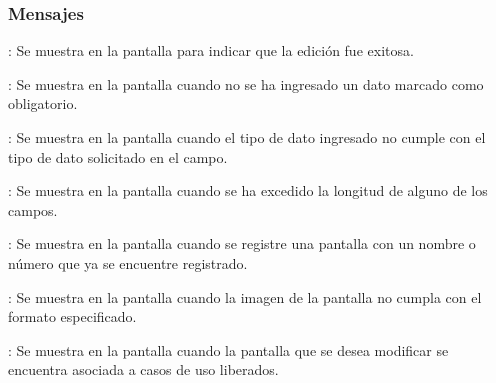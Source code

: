 \subsubsection{Mensajes}

\begin{Citemize}
	\item {}: Se muestra en la pantalla  para indicar que la edición fue exitosa.
	\item {}: Se muestra en la pantalla  cuando no se ha ingresado un dato marcado como obligatorio.
	\item {}: Se muestra en la pantalla  cuando el tipo de dato ingresado no cumple con el tipo de dato solicitado en el campo.
	\item {}: Se muestra en la pantalla  cuando se ha excedido la longitud de alguno de los campos.
	\item {}: Se muestra en la pantalla  cuando se registre una pantalla con un nombre o número que ya se encuentre registrado.
	\item {}: Se muestra en la pantalla  cuando la imagen de la pantalla no cumpla con el formato especificado.
	\item {}: Se muestra en la pantalla  cuando la pantalla que se desea modificar se encuentra asociada a casos de uso liberados.
\end{Citemize}
